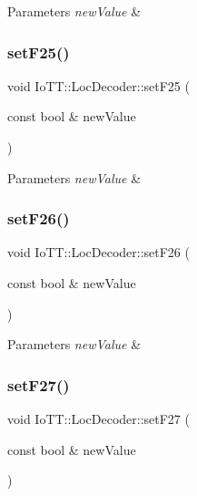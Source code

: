 \begin{DoxyParams}{Parameters}
{\em new\+Value} & \\
\hline
\end{DoxyParams}
\mbox{\label{classIoTT_1_1LocDecoder_ac767e22e04d636a034e71faa72854afa}} 
\subsubsection{\texorpdfstring{set\+F25()}{setF25()}}
{\footnotesize\ttfamily void Io\+T\+T\+::\+Loc\+Decoder\+::set\+F25 (\begin{DoxyParamCaption}\item[{const bool \&}]{new\+Value }\end{DoxyParamCaption})}


\begin{DoxyParams}{Parameters}
{\em new\+Value} & \\
\hline
\end{DoxyParams}
\mbox{\label{classIoTT_1_1LocDecoder_ab46b1404908d6362cdd1660a871b92a1}} 
\subsubsection{\texorpdfstring{set\+F26()}{setF26()}}
{\footnotesize\ttfamily void Io\+T\+T\+::\+Loc\+Decoder\+::set\+F26 (\begin{DoxyParamCaption}\item[{const bool \&}]{new\+Value }\end{DoxyParamCaption})}


\begin{DoxyParams}{Parameters}
{\em new\+Value} & \\
\hline
\end{DoxyParams}
\mbox{\label{classIoTT_1_1LocDecoder_ac3293265ed2d36d721e637e0a4f8f1ae}} 
\subsubsection{\texorpdfstring{set\+F27()}{setF27()}}
{\footnotesize\ttfamily void Io\+T\+T\+::\+Loc\+Decoder\+::set\+F27 (\begin{DoxyParamCaption}\item[{const bool \&}]{new\+Value }\end{DoxyParamCaption})}


